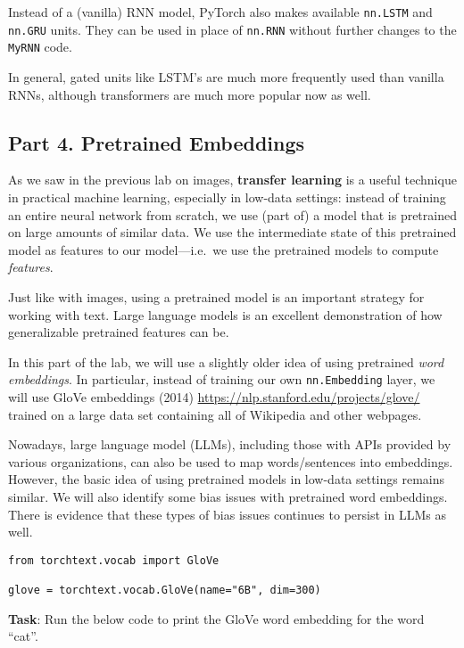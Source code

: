 \documentclass[
  letterpaper,
  DIV=11,
  numbers=noendperiod]{scrartcl}
\begin{document}
Instead of a (vanilla) RNN model, PyTorch also makes available
\texttt{nn.LSTM} and \texttt{nn.GRU} units. They can be used in place of
\texttt{nn.RNN} without further changes to the \texttt{MyRNN} code.

In general, gated units like LSTM's are much more frequently used than
vanilla RNNs, although transformers are much more popular now as well.

\subsection{Part 4. Pretrained
Embeddings}\label{part-4.-pretrained-embeddings}

As we saw in the previous lab on images, \textbf{transfer learning} is a
useful technique in practical machine learning, especially in low-data
settings: instead of training an entire neural network from scratch, we
use (part of) a model that is pretrained on large amounts of similar
data. We use the intermediate state of this pretrained model as features
to our model---i.e.~we use the pretrained models to compute
\emph{features}.

Just like with images, using a pretrained model is an important strategy
for working with text. Large language models is an excellent
demonstration of how generalizable pretrained features can be.

In this part of the lab, we will use a slightly older idea of using
pretrained \emph{word embeddings}. In particular, instead of training
our own \texttt{nn.Embedding} layer, we will use GloVe embeddings (2014)
\url{https://nlp.stanford.edu/projects/glove/} trained on a large data
set containing all of Wikipedia and other webpages.

Nowadays, large language model (LLMs), including those with APIs
provided by various organizations, can also be used to map
words/sentences into embeddings. However, the basic idea of using
pretrained models in low-data settings remains similar. We will also
identify some bias issues with pretrained word embeddings. There is
evidence that these types of bias issues continues to persist in LLMs as
well.

\begin{verbatim}
from torchtext.vocab import GloVe

glove = torchtext.vocab.GloVe(name="6B", dim=300)
\end{verbatim}

\textbf{Task}: Run the below code to print the GloVe word embedding for
the word ``cat''.
\end{document}
